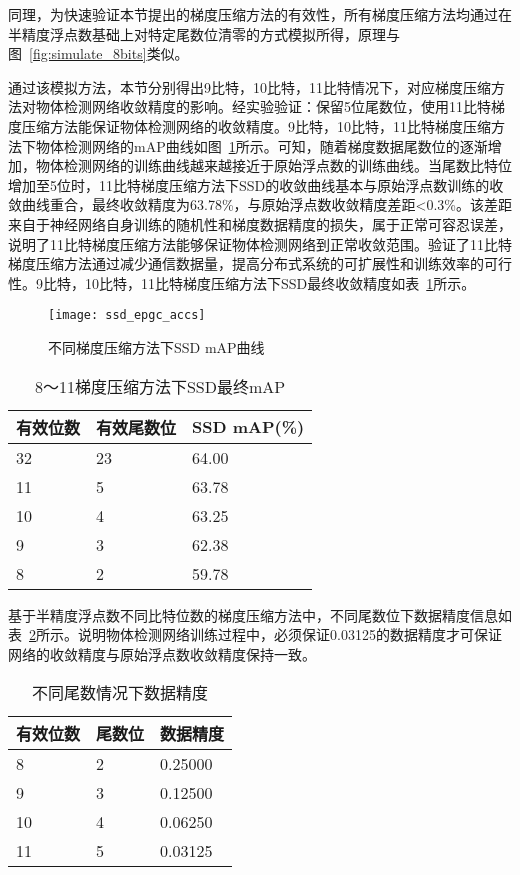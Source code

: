 同理，为快速验证本节提出的梯度压缩方法的有效性，所有梯度压缩方法均通过在半精度浮点数基础上对特定尾数位清零的方式模拟所得，原理与图~\ref{fig:simulate_8bits}类似。

通过该模拟方法，本节分别得出9比特，10比特，11比特情况下，对应梯度压缩方法对物体检测网络收敛精度的影响。经实验验证：保留5位尾数位，使用11比特梯度压缩方法能保证物体检测网络的收敛精度。9比特，10比特，11比特梯度压缩方法下物体检测网络的mAP曲线如图~\ref{fig:ssd_epgc_accs}所示。可知，随着梯度数据尾数位的逐渐增加，物体检测网络的训练曲线越来越接近于原始浮点数的训练曲线。当尾数比特位增加至5位时，11比特梯度压缩方法下SSD的收敛曲线基本与原始浮点数训练的收敛曲线重合，最终收敛精度为63.78\%，与原始浮点数收敛精度差距<0.3\%。该差距来自于神经网络自身训练的随机性和梯度数据精度的损失，属于正常可容忍误差，说明了11比特梯度压缩方法能够保证物体检测网络到正常收敛范围。验证了11比特梯度压缩方法通过减少通信数据量，提高分布式系统的可扩展性和训练效率的可行性。9比特，10比特，11比特梯度压缩方法下SSD最终收敛精度如表~\ref{tab:ssd_epdc_final_accs}所示。

\begin{figure}[htp]
\centering
\texttt{[image: ssd\_epgc\_accs]}
\caption{不同梯度压缩方法下SSD mAP曲线}
\label{fig:ssd_epgc_accs}
\end{figure}

\begin{table}[htb]
\centering
\noindent\begin{minipage}{0.6\textwidth}
\centering
\caption{8～11梯度压缩方法下SSD最终mAP}
\label{tab:ssd_epdc_final_accs}
\begin{tabular}{p{2cm}p{2cm}p{2.5cm}}
\toprule[1.5pt]
有效位数 & 有效尾数位 & SSD mAP(\%) \\\midrule[1pt]
32 & 23 & 64.00 \\
11 & 5 &  63.78 \\
10 & 4 & 63.25 \\
9 & 3 & 62.38 \\
8 & 2 & 59.78 \\
\midrule[1pt]
\end{tabular}
\end{minipage}
\end{table}

基于半精度浮点数不同比特位数的梯度压缩方法中，不同尾数位下数据精度信息如表~\ref{tab:ssd_epdc_precisions}所示。说明物体检测网络训练过程中，必须保证0.03125的数据精度才可保证网络的收敛精度与原始浮点数收敛精度保持一致。

\begin{table}[htb]
\centering
\noindent\begin{minipage}{0.5\textwidth}
\centering
\caption{不同尾数情况下数据精度}
\label{tab:ssd_epdc_precisions}
\begin{tabular}{p{2cm}p{2cm}p{2cm}}
\toprule[1.5pt]
有效位数 & 尾数位 & 数据精度 \\\midrule[1pt]
8 & 2 & 0.25000 \\
9 & 3 & 0.12500 \\
10 & 4 & 0.06250 \\
11 & 5 & 0.03125 \\
\midrule[1pt]
\end{tabular}
\end{minipage}
\end{table}

